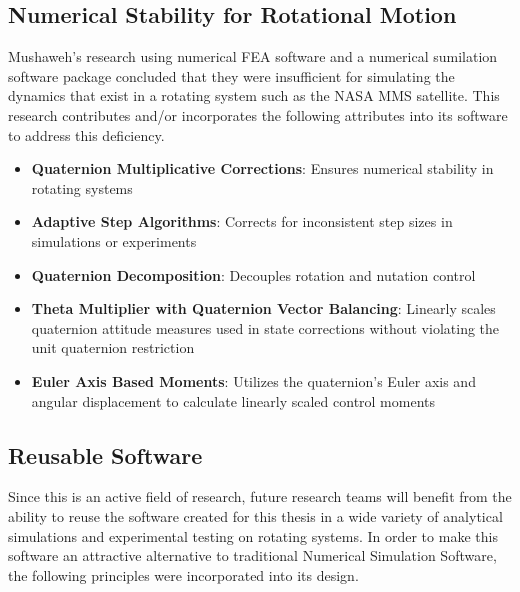 \subsection{Numerical Stability for Rotational Motion}
\label{subsec:NumericalStabilityforRotationalMotion}

Mushaweh's research using numerical FEA software and a numerical sumilation software package concluded that they were insufficient for simulating the dynamics that exist in a rotating system such as the NASA MMS satellite.  This research contributes and/or incorporates the following attributes into its software to address this deficiency.

\begin{itemize}
  \item \textbf{Quaternion Multiplicative Corrections}: Ensures numerical stability in rotating systems
  \item \textbf{Adaptive Step Algorithms}: Corrects for inconsistent step sizes in simulations or experiments
  \item \textbf{Quaternion Decomposition}: Decouples rotation and nutation control
  \item \textbf{Theta Multiplier with Quaternion Vector Balancing}: Linearly scales quaternion attitude measures used in state corrections without violating the unit quaternion restriction
  \item \textbf{Euler Axis Based Moments}: Utilizes the quaternion's Euler axis and angular displacement to calculate linearly scaled control moments
\end{itemize}

\subsection{Reusable Software}
\label{subsec:ReusableSoftware}

Since this is an active field of research, future research teams will benefit from the ability to reuse the software created for this thesis in a wide variety of analytical simulations and experimental testing on rotating systems.  In order to make this software an attractive alternative to traditional Numerical Simulation Software, the following principles were incorporated into its design.

